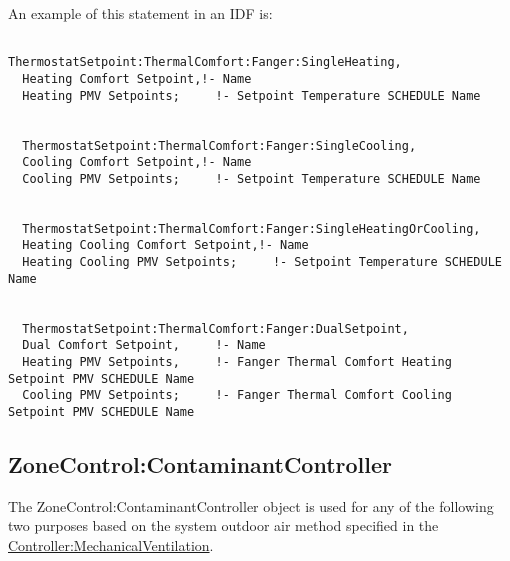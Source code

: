 An example of this statement in an IDF is:

\begin{lstlisting}

ThermostatSetpoint:ThermalComfort:Fanger:SingleHeating,
  Heating Comfort Setpoint,!- Name
  Heating PMV Setpoints;     !- Setpoint Temperature SCHEDULE Name


  ThermostatSetpoint:ThermalComfort:Fanger:SingleCooling,
  Cooling Comfort Setpoint,!- Name
  Cooling PMV Setpoints;     !- Setpoint Temperature SCHEDULE Name


  ThermostatSetpoint:ThermalComfort:Fanger:SingleHeatingOrCooling,
  Heating Cooling Comfort Setpoint,!- Name
  Heating Cooling PMV Setpoints;     !- Setpoint Temperature SCHEDULE Name


  ThermostatSetpoint:ThermalComfort:Fanger:DualSetpoint,
  Dual Comfort Setpoint,     !- Name
  Heating PMV Setpoints,     !- Fanger Thermal Comfort Heating Setpoint PMV SCHEDULE Name
  Cooling PMV Setpoints;     !- Fanger Thermal Comfort Cooling Setpoint PMV SCHEDULE Name
\end{lstlisting}

\subsection{ZoneControl:ContaminantController}\label{zonecontrolcontaminantcontroller}

The ZoneControl:ContaminantController object is used for any of the following two purposes based on the system outdoor air method specified in the \hyperref[controllermechanicalventilation]{Controller:MechanicalVentilation}.

